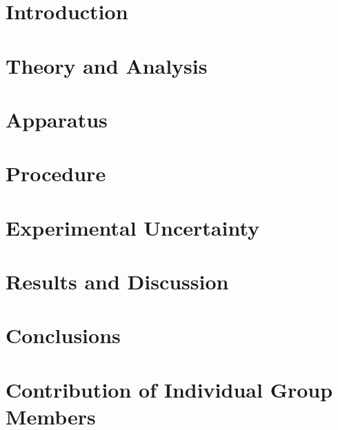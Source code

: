 \documentclass[12pt]{article}
\begin{document}



\newpage


\section{Introduction} \label{sec:1}

\clearpage
\section{Theory and Analysis} \label{sec:2}

\clearpage
\section{Apparatus} \label{sec:3}

\clearpage
\section{Procedure} \label{sec:4}

\clearpage
\section{Experimental Uncertainty} \label{sec:5}

\clearpage
\section{Results and Discussion} \label{sec:6}


\clearpage
\section{Conclusions} \label{sec:7}


\clearpage
\label{sec:8}



\section{Contribution of Individual Group Members} \label{sec:9}

\end{document}
